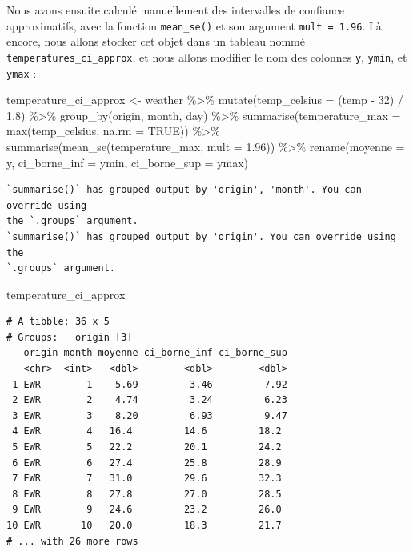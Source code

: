 \documentclass[
  a4paper,
  DIV=11,
  numbers=noendperiod,
  oneside]{scrreprt}
\newenvironment{Shaded}{}{}
\newcommand{\AttributeTok}[1]{\textcolor[rgb]{0.84,0.23,0.29}{#1}}
\newcommand{\ConstantTok}[1]{\textcolor[rgb]{0.00,0.36,0.77}{#1}}
\newcommand{\DecValTok}[1]{\textcolor[rgb]{0.00,0.36,0.77}{#1}}
\newcommand{\FloatTok}[1]{\textcolor[rgb]{0.00,0.36,0.77}{#1}}
\newcommand{\FunctionTok}[1]{\textcolor[rgb]{0.44,0.26,0.76}{#1}}
\newcommand{\NormalTok}[1]{\textcolor[rgb]{0.14,0.16,0.18}{#1}}
\newcommand{\OtherTok}[1]{\textcolor[rgb]{0.44,0.26,0.76}{#1}}
\newcommand{\SpecialCharTok}[1]{\textcolor[rgb]{0.00,0.36,0.77}{#1}}
\begin{document}
Nous avons ensuite calculé manuellement des intervalles de confiance
approximatifs, avec la fonction \texttt{mean\_se()} et son argument
\texttt{mult\ =\ 1.96}. Là encore, nous allons stocker cet objet dans un
tableau nommé \texttt{temperatures\_ci\_approx}, et nous allons modifier
le nom des colonnes \texttt{y}, \texttt{ymin}, et \texttt{ymax} :

\begin{Shaded}
\begin{Highlighting}[]
\NormalTok{temperature\_ci\_approx }\OtherTok{\textless{}{-}}\NormalTok{ weather }\SpecialCharTok{\%\textgreater{}\%} 
  \FunctionTok{mutate}\NormalTok{(}\AttributeTok{temp\_celsius =}\NormalTok{ (temp }\SpecialCharTok{{-}} \DecValTok{32}\NormalTok{) }\SpecialCharTok{/} \FloatTok{1.8}\NormalTok{) }\SpecialCharTok{\%\textgreater{}\%} 
  \FunctionTok{group\_by}\NormalTok{(origin, month, day) }\SpecialCharTok{\%\textgreater{}\%} 
  \FunctionTok{summarise}\NormalTok{(}\AttributeTok{temperature\_max =} \FunctionTok{max}\NormalTok{(temp\_celsius, }\AttributeTok{na.rm =} \ConstantTok{TRUE}\NormalTok{)) }\SpecialCharTok{\%\textgreater{}\%} 
  \FunctionTok{summarise}\NormalTok{(}\FunctionTok{mean\_se}\NormalTok{(temperature\_max, }\AttributeTok{mult =} \FloatTok{1.96}\NormalTok{)) }\SpecialCharTok{\%\textgreater{}\%} 
  \FunctionTok{rename}\NormalTok{(}\AttributeTok{moyenne =}\NormalTok{ y,}
         \AttributeTok{ci\_borne\_inf =}\NormalTok{ ymin,}
         \AttributeTok{ci\_borne\_sup =}\NormalTok{ ymax)}
\end{Highlighting}
\end{Shaded}

\begin{verbatim}
`summarise()` has grouped output by 'origin', 'month'. You can override using
the `.groups` argument.
`summarise()` has grouped output by 'origin'. You can override using the
`.groups` argument.
\end{verbatim}

\begin{Shaded}
\begin{Highlighting}[]
\NormalTok{temperature\_ci\_approx}
\end{Highlighting}
\end{Shaded}

\begin{verbatim}
# A tibble: 36 x 5
# Groups:   origin [3]
   origin month moyenne ci_borne_inf ci_borne_sup
   <chr>  <int>   <dbl>        <dbl>        <dbl>
 1 EWR        1    5.69         3.46         7.92
 2 EWR        2    4.74         3.24         6.23
 3 EWR        3    8.20         6.93         9.47
 4 EWR        4   16.4         14.6         18.2 
 5 EWR        5   22.2         20.1         24.2 
 6 EWR        6   27.4         25.8         28.9 
 7 EWR        7   31.0         29.6         32.3 
 8 EWR        8   27.8         27.0         28.5 
 9 EWR        9   24.6         23.2         26.0 
10 EWR       10   20.0         18.3         21.7 
# ... with 26 more rows
\end{verbatim}
\end{document}
